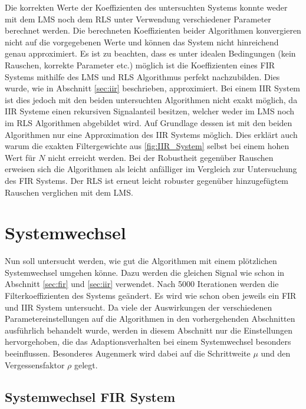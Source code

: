 Die korrekten Werte der Koeffizienten des untersuchten Systems konnte weder mit dem LMS noch dem RLS unter Verwendung verschiedener Parameter berechnet werden.
Die berechneten Koeffizienten beider Algorithmen konvergieren nicht auf die vorgegebenen Werte und können das System nicht hinreichend genau approximiert.
Es ist zu beachten, dass es unter idealen Bedingungen (kein Rauschen, korrekte Parameter etc.) möglich ist die Koeffizienten eines FIR Systems mithilfe des LMS und RLS Algorithmus perfekt nachzubilden.
Dies wurde, wie in Abschnitt \ref{sec:iir} beschrieben, approximiert.
Bei einem IIR System ist dies jedoch mit den beiden untersuchten Algorithmen nicht exakt möglich, da IIR Systeme einen rekursiven Signalanteil besitzen, welcher weder im LMS noch im RLS Algorithmen abgebildet wird.
Auf Grundlage dessen ist mit den beiden Algorithmen nur eine Approximation des IIR Systems möglich.
Dies erklärt auch warum die exakten Filtergewichte aus \ref{fig:IIR_System} selbst bei einem hohen Wert für $N$ nicht erreicht werden.
Bei der Robustheit gegenüber Rauschen erweisen sich die Algorithmen als leicht anfälliger im Vergleich zur Untersuchung des FIR Systems.
Der RLS ist erneut leicht robuster gegenüber hinzugefügtem Rauschen verglichen mit dem LMS.





\section{Systemwechsel}
\label{sec:Systemwechsel}

Nun soll untersucht werden, wie gut die Algorithmen mit einem plötzlichen Systemwechsel umgehen könne. 
Dazu werden die gleichen Signal wie schon in Abschnitt \ref{sec:fir} und \ref{sec:iir} verwendet.
Nach 5000 Iterationen werden die Filterkoeffizienten des Systems geändert.
Es wird wie schon oben jeweils ein FIR und IIR System untersucht.
Da viele der Auswirkungen der verschiedenen Parametereinstellungen auf die Algorithmen in den vorhergehenden Abschnitten ausführlich behandelt wurde, werden in diesem Abschnitt nur die Einstellungen hervorgehoben, die das Adaptionsverhalten bei einem Systemwechsel besonders beeinflussen.
Besonderes Augenmerk wird dabei auf die Schrittweite $\mu$ und den Vergessensfaktor $\rho$ gelegt.


\subsection{Systemwechsel FIR System}

